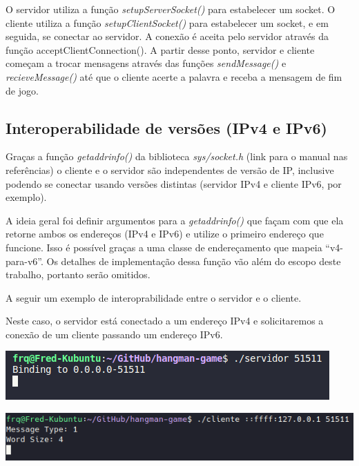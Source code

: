 \documentclass[12pt]{article}
\begin{document}
O servidor utiliza a função \emph{setupServerSocket()} para estabelecer um socket.
O cliente utiliza a função \emph{setupClientSocket()} para estabelecer um socket, e em seguida, se conectar ao servidor.
A conexão é aceita pelo servidor através da função \emph{}{acceptClientConnection()}.
A partir desse ponto, servidor e cliente começam a trocar mensagens através das funções \emph{sendMessage()} e \emph{recieveMessage()} até que o cliente acerte a palavra e receba a mensagem de fim de jogo.

\subsection{Interoperabilidade de versões (IPv4 e IPv6)}
Graças a função \emph{getaddrinfo()} da biblioteca \emph{sys/socket.h} (link para o manual nas referências)
o cliente e o servidor são independentes de versão de IP, inclusive podendo se conectar usando versões distintas (servidor IPv4 e cliente IPv6, por exemplo). \par

A ideia geral foi definir argumentos para a \emph{getaddrinfo()} que façam com que ela retorne ambos os endereços (IPv4 e IPv6) e utilize o primeiro endereço que funcione.
Isso é possível graças a uma classe de endereçamento que mapeia ``v4-para-v6''. Os detalhes de implementação dessa função vão além do escopo deste trabalho, portanto serão omitidos. \par

A seguir um exemplo de interoprabilidade entre o servidor e o cliente. \par Neste caso, o servidor está conectado a um endereço IPv4 e solicitaremos a conexão de um cliente passando um endereço IPv6.

\begin{center}
    \includegraphics{Figura3.png}
\end{center}

\begin{center}
    \includegraphics{Figura4.png}
\end{center}
\end{document}
